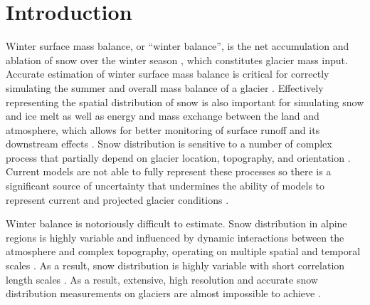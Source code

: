 \documentclass[twocolumn, letterpaper]{igs}
\begin{document}
\section{Introduction}

Winter surface mass balance, or ``winter balance'', is the net accumulation and ablation of snow over the winter season \citep{Cogley2011}, which constitutes glacier mass input. Accurate estimation of winter surface mass balance is critical for correctly simulating the summer and overall mass balance of a glacier \citep[e.g.][]{Hock2005}. Effectively representing the spatial distribution of snow is also important for simulating snow and ice melt as well as energy and mass exchange between the land and atmosphere, which allows for better monitoring of surface runoff and its downstream effects \citep[e.g.][]{Clark2011}. Snow distribution is sensitive to a number of complex process that partially depend on glacier location, topography, and orientation \citep[e.g.][]{Bloschl1991, Mott2008, Clark2011, Sold2013}. Current models are not able to fully represent these processes so there is a significant source of uncertainty that undermines the ability of models to represent current and projected glacier conditions \citep{Reveillet2016}. 

Winter balance is notoriously difficult to estimate. Snow distribution in alpine regions is highly variable and influenced by dynamic interactions between the atmosphere and complex topography, operating on multiple spatial and temporal scales \citep[e.g.][]{Barry1992, Liston2006, Clark2011}. As a result, snow distribution is highly variable with short correlation length scales \citep[e.g.][]{Anderton2004, Egli2011, Grunewald2010, Helbig2017, Lopez2011, Lopez2013, Machguth2006, Marshall2006}. As a result, extensive, high resolution and accurate snow distribution measurements on glaciers are almost impossible to achieve \citep[e.g.][]{Cogley2011, McGrath2015}.
\end{document}
